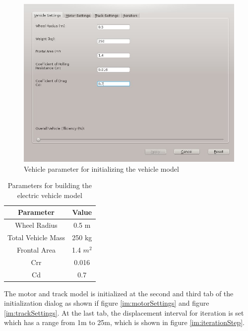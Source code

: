 \begin{figure}[htb]
	\centering
	\includegraphics[width=5in]{images/vehicle_settings.jpg}
	\caption{Vehicle parameter for initializing the vehicle model}
	\label{im:vehicleSettings}
\end{figure}

\begin{table}[htbp]
\begin{center}
\begin{tabular}{|c|c|}
\hline
\textbf{Parameter} & \textbf{Value} \\ \hline
Wheel Radius & 0.5 m \\ \hline
Total Vehicle Mass & 250 kg \\ \hline
Frontal Area & 1.4 $m^2$ \\ \hline
Crr & 0.016 \\ \hline
Cd & 0.7 \\ \hline
\end{tabular}
\end{center}
\caption{Parameters for building the electric vehicle model}
\label{tb:vehicleModelParameter}
\end{table}

The motor and track model is initialized at the second and third tab of the initialization dialog as shown if figure \ref{im:motorSettings} and figure \ref{im:trackSettings}. At the last tab, the displacement interval for iteration is set which has a range from 1m to 25m, which is shown in figure \ref{im:iterationStep}.

